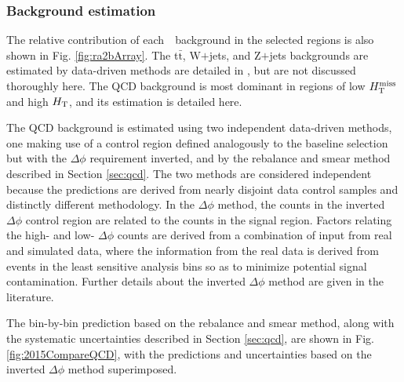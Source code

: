 \subsubsection{Background estimation}
The relative contribution of each~\sm~background in the selected regions is also shown in Fig. \ref{fig:ra2bArray}. The t$\bar{\text{t}}$, W$+$jets, and Z$+$jets backgrounds are estimated by data-driven methods are detailed in  \cite{Khachatryan:2016kdk}, but are not discussed thoroughly here. The QCD background is most dominant in regions of low $H_{\text{T}}^{\rm miss}$ and high $H_{\rm T}$, and its estimation is detailed here.

The QCD background is estimated using two independent data-driven methods, one making use of a control region defined analogously to the baseline selection but with the $\Delta\phi$ requirement inverted, and by the rebalance and smear method described in Section \ref{sec:qcd}. The two methods are considered independent because the predictions are derived from nearly disjoint data control samples and distinctly different methodology. In the $\Delta\phi$ method, the counts in the inverted $\Delta\phi$ control region are related to the counts in the signal region. Factors relating the high- and low- $\Delta\phi$ counts are derived from a combination of input from real and simulated data, where the information from the real data is derived from events in the least sensitive analysis bins so as to minimize potential signal contamination. Further details about the inverted $\Delta\phi$ method are given in the literature.

The bin-by-bin prediction based on the rebalance and smear method, along with the systematic uncertainties described in Section \ref{sec:qcd}, are shown in Fig. \ref{fig:2015CompareQCD}, with the predictions and uncertainties based on the inverted $\Delta\phi$ method superimposed. 


